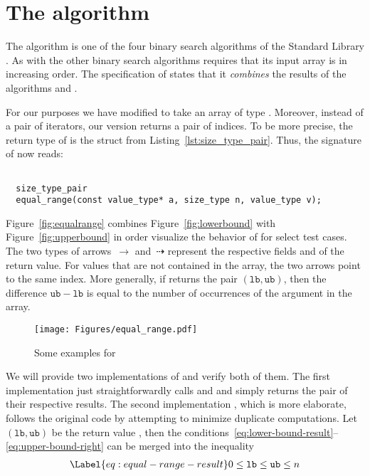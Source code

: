 \section{The \equalrange algorithm}

The \equalrange algorithm is one of the four binary search algorithms
of the \cxx Standard Library \cite[\S 28.7.3.3]{cxx-17-draft}.
As with the other binary search algorithms \equalrange requires that
its input array is in increasing order.
The specification of \equalrange states that it \emph{combines} the results of the algorithms
 and .

For our purposes we have modified
\equalrange
to take an array of type .
Moreover, instead of a pair of iterators, our version returns a pair of indices.
To be more precise, the return type of \equalrange is the
struct \sizetypepair from Listing~\ref{lst:size_type_pair}.
Thus, the signature of \equalrange now reads:

\begin{lstlisting}[style = acsl-block]

  size_type_pair
  equal_range(const value_type* a, size_type n, value_type v);
\end{lstlisting}

Figure~\ref{fig:equalrange} combines Figure~\ref{fig:lowerbound} with Figure~\ref{fig:upperbound}
in order visualize the behavior of \equalrange for select test cases.
The two types of arrows~$\rightarrow$ and~$\dashrightarrow$ represent the
respective fields  and  of the return value.
For values that are not contained in the array, the two arrows point to the same index.
More generally, if \equalrange returns the pair $(\mathtt{lb},\mathtt{ub})$, then
the difference $\mathtt{ub} - \mathtt{lb}$ is equal to the number of occurrences of the 
argument  in the array.

\begin{figure}[hbt]
\centering
\texttt{[image: Figures/equal\_range.pdf]}
\caption{Some examples for \equalrange}
\end{figure}

\FloatBarrier

We will provide two implementations of \equalrange and verify both of them.
The first implementation  just straightforwardly
calls  and  and simply
returns the pair of their respective results.
The second implementation , which is more elaborate, follows the
original \cxx code by attempting to minimize duplicate computations.
%
Let $(\mathtt{lb}, \mathtt{ub})$ be the return value  \equalrange, then
the conditions~\eqref{eq:lower-bound-result}--\eqref{eq:upper-bound-right} can
be merged into the inequality
%
\begin{align}
\Label{eq:equal-range-result}
0 \leq \mathtt{lb} \leq \mathtt{ub} \leq n 
\end{align}

